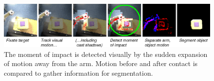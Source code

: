 
\begin{figure}[tbh]
  \begin{center}
\includegraphics[width=\columnwidth]{fig-poke-zoom.eps}
  \end{center}
  \caption{
    The moment of impact is detected visually by the
    sudden expansion of motion away from the arm.  Motion before and
    after contact is compared to gather information for segmentation.
}
\end{figure}

